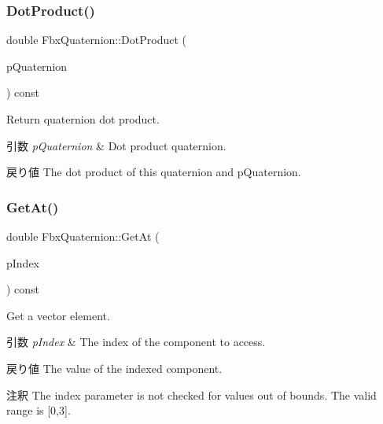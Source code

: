 \subsubsection{\texorpdfstring{Dot\+Product()}{DotProduct()}}
{\footnotesize\ttfamily double Fbx\+Quaternion\+::\+Dot\+Product (\begin{DoxyParamCaption}\item[{const \hyperlink{class_fbx_quaternion}{Fbx\+Quaternion} \&}]{p\+Quaternion }\end{DoxyParamCaption}) const}

Return quaternion dot product. 
\begin{DoxyParams}{引数}
{\em p\+Quaternion} & Dot product quaternion. \\
\hline
\end{DoxyParams}
\begin{DoxyReturn}{戻り値}
The dot product of this quaternion and p\+Quaternion. 
\end{DoxyReturn}
\mbox{\label{class_fbx_quaternion_aa7fe9d4df71f455b8595254aece53842}} 
\subsubsection{\texorpdfstring{Get\+At()}{GetAt()}}
{\footnotesize\ttfamily double Fbx\+Quaternion\+::\+Get\+At (\begin{DoxyParamCaption}\item[{int}]{p\+Index }\end{DoxyParamCaption}) const}

Get a vector element. 
\begin{DoxyParams}{引数}
{\em p\+Index} & The index of the component to access. \\
\hline
\end{DoxyParams}
\begin{DoxyReturn}{戻り値}
The value of the indexed component. 
\end{DoxyReturn}
\begin{DoxyRemark}{注釈}
The index parameter is not checked for values out of bounds. The valid range is \mbox{[}0,3\mbox{]}. 
\end{DoxyRemark}
\mbox{\label{class_fbx_quaternion_ae81b85793e46d5a69d2aaed1be7e403e}} 
